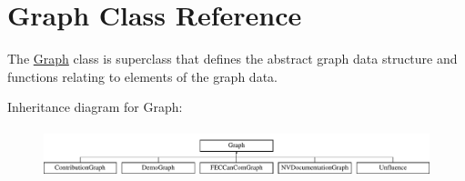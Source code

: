 \hypertarget{classGraph}{
\section{Graph Class Reference}
\label{classGraph}
}


The \hyperlink{classGraph}{Graph} class is superclass that defines the abstract graph data structure and functions relating to elements of the graph data.  


Inheritance diagram for Graph:\begin{figure}[H]
\begin{center}
\leavevmode
\includegraphics[height=1.435897cm]{classGraph}
\end{center}
\end{figure}
